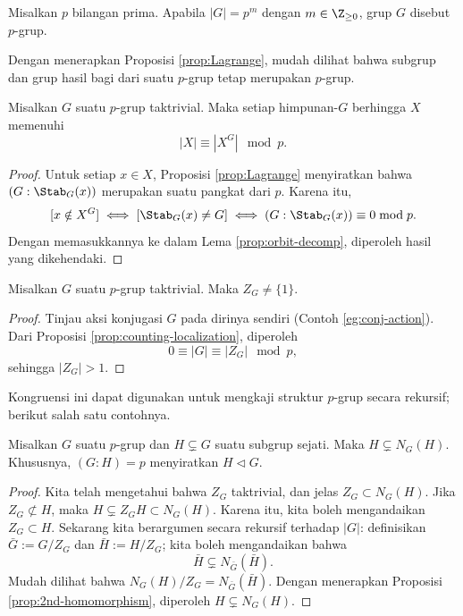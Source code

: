 \begin{definition}\label{def:p-group}
	Misalkan $p$ bilangan prima. Apabila $|G|=p^m$ dengan $m \in \Z_{\geq 0}$, grup $G$ disebut $p$-grup.
\end{definition}
Dengan menerapkan Proposisi \ref{prop:Lagrange}, mudah dilihat bahwa subgrup dan grup hasil bagi dari suatu $p$-grup tetap merupakan $p$-grup.

\begin{proposition}\label{prop:counting-localization}
	Misalkan $G$ suatu $p$-grup taktrivial. Maka setiap himpunan-$G$ berhingga $X$ memenuhi
	\[ |X| \equiv \left\lvert X^G \right\rvert \mod p. \]
\end{proposition}
\begin{proof}
	Untuk setiap $x \in X$, Proposisi \ref{prop:Lagrange} menyiratkan bahwa $(G: \Stab_G(x))$ merupakan suatu pangkat dari $p$. Karena itu,
	\[ [ x \notin X^G] \iff [ \Stab_G(x) \neq G ] \iff (G: \Stab_G(x)) \equiv 0 \bmod p . \]
	Dengan memasukkannya ke dalam Lema \ref{prop:orbit-decomp}, diperoleh hasil yang dikehendaki.
\end{proof}

\begin{corollary}\label{prop:p-group-center}
	Misalkan $G$ suatu $p$-grup taktrivial. Maka $Z_G \neq \{1\}$.
\end{corollary}
\begin{proof}
	Tinjau aksi konjugasi $G$ pada dirinya sendiri (Contoh \ref{eg:conj-action}). Dari Proposisi \ref{prop:counting-localization}, diperoleh
	\[ 0 \equiv |G| \equiv |Z_G| \mod p , \]
	sehingga $|Z_G| > 1$.
\end{proof}

Kongruensi ini dapat digunakan untuk mengkaji struktur $p$-grup secara rekursif; berikut salah satu contohnya.
\begin{corollary}
	Misalkan $G$ suatu $p$-grup dan $H \subsetneq G$ suatu subgrup sejati. Maka $H \subsetneq N_G(H)$. Khususnya, $(G:H)=p$ menyiratkan $H \lhd G$.
\end{corollary}
\begin{proof}
	Kita telah mengetahui bahwa $Z_G$ taktrivial, dan jelas $Z_G \subset N_G(H)$. Jika $Z_G \not\subset H$, maka $H \subsetneq Z_G H \subset N_G(H)$. Karena itu, kita boleh mengandaikan $Z_G \subset H$. Sekarang kita berargumen secara rekursif terhadap $|G|$: definisikan $\bar{G} := G/Z_G$ dan $\bar{H} := H/Z_G$; kita boleh mengandaikan bahwa
	\[ \bar{H} \subsetneq N_{\bar{G}}(\bar{H}). \]
	Mudah dilihat bahwa $N_G(H)/Z_G = N_{\bar{G}}(\bar{H})$. Dengan menerapkan Proposisi \ref{prop:2nd-homomorphism}, diperoleh $H \subsetneq N_G(H)$.
\end{proof}

